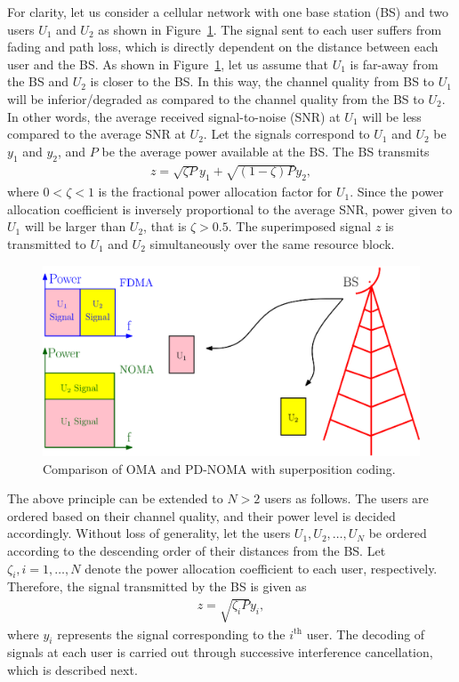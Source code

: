 \begin{multicols}{2}
For clarity, let us consider a cellular network with one base station (BS) and two users $U_1$ and $U_2$ as shown in Figure~\ref{Fig-SC2Users}. The signal sent to each user suffers from fading and path loss, which is directly dependent on the distance between each user and the BS. As shown in Figure~\ref{Fig-SC2Users}, let us assume that $U_1$ is far-away from the BS and $U_2$ is closer to the BS. In this way, the channel quality from BS to $U_1$ will be inferior/degraded as compared to the channel quality from the BS to $U_2$. In other words, the average received signal-to-noise (SNR) at $U_1$ will be less compared to the average SNR at $U_2$. Let the signals correspond to $U_1$ and $U_2$ be $y_1$ and $y_2$, and $P$ be the average power available at the BS. The BS transmits
\setcounter{equation}{0}
\begin{align}
z = \sqrt{\zeta P} y_1 + \sqrt{(1-\zeta) P} y_2,
\end{align}
where $0 < \zeta < 1$ is the fractional power allocation factor for $U_1$. Since the power allocation coefficient is inversely proportional to the average SNR, power given to $U_1$ will be larger than $U_2$, that is $\zeta > 0.5$. The superimposed signal $z$ is transmitted to $U_1$ and $U_2$ simultaneously over the same resource block.
\begin{figure}[H]
\centering
  \includegraphics[scale=0.5]{src/Figures/chap5/NOMA_SC_2Users.eps}
  \caption{Comparison of OMA and PD-NOMA with superposition coding.} \label{Fig-SC2Users}
\end{figure}
The above principle can be extended to $N > 2$ users as follows. The users are ordered based on their channel quality, and their power level is decided accordingly. Without loss of generality, let the users $U_1, U_2, \ldots, U_N$ be ordered according to the descending order of their distances from the BS. Let $\zeta_i, i=1,\ldots,N$ denote the power allocation coefficient to each user, respectively. Therefore, the signal transmitted by the BS is given as
\begin{align}
z = \sqrt{\zeta_i P} y_i,
\end{align}
where $y_i$ represents the signal corresponding to the $i^{\text{th}}$ user. The decoding of signals at each user is carried out through successive interference cancellation, which is described next.


\end{multicols}
